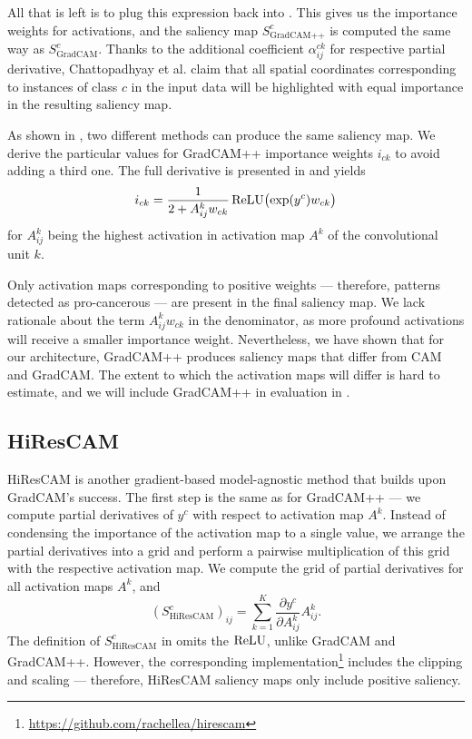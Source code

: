 All that is left is to plug this expression back into .
This gives us the importance weights for activations, and the saliency map $S^c_{\text{GradCAM++}}$ is computed the same way as $S^c_{\text{GradCAM}}$.
Thanks to the additional coefficient $\alpha^{ck}_{ij}$ for respective partial derivative, Chattopadhyay et al. \cite{grad-cam-pp} claim that all spatial coordinates corresponding to instances of class $c$ in the input data will be highlighted with equal importance in the resulting saliency map.

As shown in , two different methods can produce the same saliency map.
We derive the particular values for GradCAM++ importance weights $i_{ck}$ to avoid adding a third one.
The full derivative is presented in  and yields
\begin{equation}
    i_{ck} = \frac{1}{2 + A^k_{ij}w_{ck}} \operatorname{ReLU}\bigl(\exp(y^c)w_{ck}\bigr)
\end{equation}
for $A^k_{ij}$ being the highest activation in activation map $A^k$ of the convolutional unit $k$.

Only activation maps corresponding to positive weights --- therefore, patterns detected as pro-cancerous --- are present in the final saliency map.
We lack rationale about the term $A^k_{ij} w_{ck}$ in the denominator, as more profound activations will receive a smaller importance weight.
Nevertheless, we have shown that for our architecture, GradCAM++ produces saliency maps that differ from CAM and GradCAM.
The extent to which the activation maps will differ is hard to estimate, and we will include GradCAM++ in evaluation in .

\subsection{HiResCAM}\label{sub:hirescam}

HiResCAM \cite{hires-cam} is another gradient-based model-agnostic method that builds upon GradCAM's success.
The first step is the same as for GradCAM++ --- we compute partial derivatives of $y^c$ with respect to activation map $A^k$.
Instead of condensing the importance of the activation map to a single value, we arrange the partial derivatives into a grid and perform a pairwise multiplication of this grid with the respective activation map.
We compute the grid of partial derivatives for all activation maps $A^k$, and
\begin{equation}
    (S^c_{\text{HiResCAM}})_{ij}
        = \sum_{k=1}^K \frac{\partial y^c}{\partial A^k_{ij}} A^k_{ij}.
\end{equation}
The definition of $S^c_{\text{HiResCAM}}$ in \cite{hires-cam} omits the $\operatorname{ReLU}$, unlike GradCAM and GradCAM++.
However, the corresponding implementation\footnote{\url{https://github.com/rachellea/hirescam}} includes the clipping and scaling --- therefore, HiResCAM saliency maps only include positive saliency.

